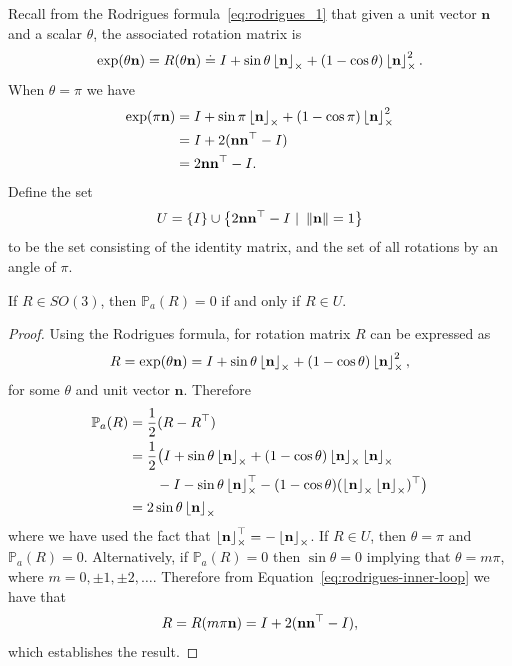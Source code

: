 Recall from the Rodrigues formula~\eqref{eq:rodrigues_1} that given a unit vector $\mathbf{n}$ and a scalar $\theta$, the associated rotation matrix is
\[
\exp(\theta\mathbf{n}) = R(\theta\mathbf{n}) \doteq I + \sin\theta \ss{\mathbf{n}} + (1-\cos\theta)\ss{\mathbf{n}}^2.
\]
When $\theta = \pi$ we have
\begin{align*}
\exp(\pi\mathbf{n}) &= I + \sin\pi \ss{\mathbf{n}} + (1-\cos\pi)\ss{\mathbf{n}}^2 \\
  &= I + 2(\nbf\nbf^\top - I) \\
  &= 2\nbf\nbf^\top - I.
\end{align*}
Define the set 
\[
U = \{ I\} \cup \left\{2\nbf\nbf^\top - I ~|~ \norm{\nbf}=1  \right\}
\]
to be the set consisting of the identity matrix, and the set of all rotations by an angle of $\pi$.
\begin{lemma}\label{lem:set_U}
If $R\in SO(3)$, then $\mathbb{P}_a(R)=0$ if and only if $R\in U$.
\end{lemma}
\begin{proof}
Using the Rodrigues formula, for rotation matrix $R$ can be expressed as 
\begin{equation}\label{eq:rodrigues-inner-loop}
R = \exp(\theta \mathbf{n}) = I + \sin\theta \ss{\nbf} + (1-\cos\theta)\ss{\nbf}^2,
\end{equation}
for some $\theta$ and unit vector $\mathbf{n}$.  Therefore 
\begin{align*}
\mathbb{P}_a(R) &= \frac{1}{2}(R-R^\top) \\
                &= \frac{1}{2}\big( I + \sin\theta \ss{\nbf} + (1-\cos\theta) \ss{\nbf}\ss{\nbf} \\
                &\qquad - I - \sin\theta \ss{\nbf}^\top - (1-\cos\theta) (\ss{\nbf}\ss{\nbf})^\top\big) \\
                &= 2 \sin\theta \ss{\nbf} 
\end{align*}
where we have used the fact that $\ss{\nbf}^\top=-\ss{\nbf}$.  If $R\in U$, then $\theta=\pi$ and $\mathbb{P}_a(R)=0$.  Alternatively, if $\mathbb{P}_a(R)=0$ then $\sin\theta=0$ implying that $\theta = m\pi$, where $m=0, \pm 1, \pm 2, \dots$.  Therefore from Equation~\eqref{eq:rodrigues-inner-loop} we have that
\[
R = R(m\pi\mathbf{n}) = I  + 2(\nbf\nbf^\top - I),
\]
which establishes the result.
\end{proof}


